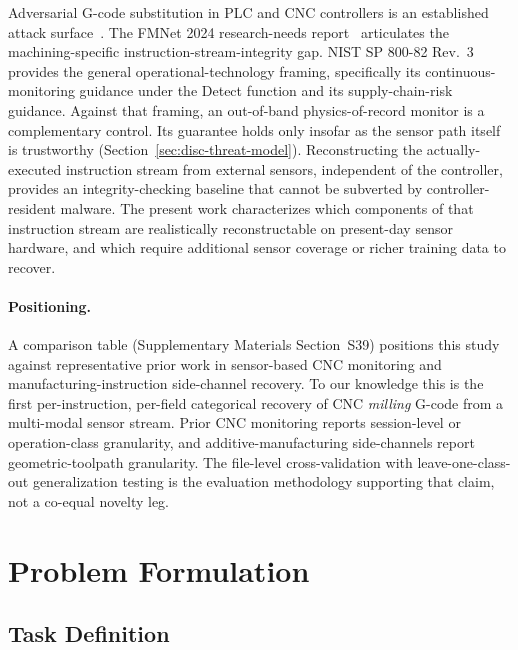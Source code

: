 \documentclass[sensors,article,submit,moreauthors,pdftex]{Definitions/mdpi}
\begin{document}
Adversarial G-code substitution in PLC and CNC controllers is an established attack surface~\cite{zonouz2014plc,sturm2014cyber,yampolskiy2018security,kimmell2025cnc,belikovetsky2017drowned}. The FMNet 2024 research-needs report~\cite{nist2024fmnet} articulates the machining-specific instruction-stream-integrity gap. NIST SP 800-82 Rev.~3~\cite{nist2023sp80082} provides the general operational-technology framing, specifically its continuous-monitoring guidance under the Detect function and its supply-chain-risk guidance. Against that framing, an out-of-band physics-of-record monitor is a complementary control. Its guarantee holds only insofar as the sensor path itself is trustworthy (Section~\ref{sec:disc-threat-model}). Reconstructing the actually-executed instruction stream from external sensors, independent of the controller, provides an integrity-checking baseline that cannot be subverted by controller-resident malware. The present work characterizes which components of that instruction stream are realistically reconstructable on present-day sensor hardware, and which require additional sensor coverage or richer training data to recover.

\paragraph{Positioning.} A comparison table (Supplementary Materials Section~S39) positions this study against representative prior work in sensor-based CNC monitoring and manufacturing-instruction side-channel recovery.\label{sec:related-comparison} To our knowledge this is the first per-instruction, per-field categorical recovery of CNC \emph{milling} G-code from a multi-modal sensor stream. Prior CNC monitoring reports session-level or operation-class granularity, and additive-manufacturing side-channels report geometric-toolpath granularity. The file-level cross-validation with leave-one-class-out generalization testing is the evaluation methodology supporting that claim, not a co-equal novelty leg.

\section{Problem Formulation}
\label{sec:problem}

\subsection{Task Definition}
\label{sec:task}
\end{document}
